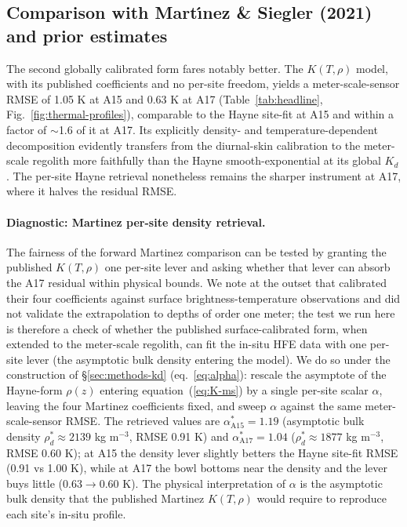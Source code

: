 \documentclass[11pt]{article}
\begin{document}
\subsection{Comparison with Mart{\'\i}nez \& Siegler (2021) and prior estimates}%
\label{sec:disc-prior}
The second globally calibrated
form fares notably better. The \citet{martinez2021} $K(T,\rho)$ model,
with its published coefficients and no per-site freedom, yields a
meter-scale-sensor RMSE of 1.05 K at A15 and 0.63 K at A17
(Table~\ref{tab:headline}, Fig.~\ref{fig:thermal-profiles}),
comparable to the Hayne site-fit at A15 and within a factor of
$\sim$1.6 of it at A17. Its explicitly density- and
temperature-dependent decomposition evidently transfers from the
diurnal-skin calibration to the meter-scale regolith more faithfully
than the Hayne smooth-exponential at its global $K_d$. The per-site
Hayne retrieval nonetheless remains the sharper instrument at A17,
where it halves the residual RMSE.

\paragraph*{Diagnostic: Martinez per-site density retrieval.}
The fairness of the forward Martinez comparison can be tested by granting
the published $K(T,\rho)$ one per-site lever and asking whether that lever
can absorb the A17 residual within physical bounds. We note at the outset
that \citet{martinez2021} calibrated their four coefficients against surface
brightness-temperature observations and did not validate the extrapolation
to depths of order one meter; the test we run here is therefore a check of
whether the published surface-calibrated form, when extended to the
meter-scale regolith, can fit the in-situ HFE data with one
per-site lever (the asymptotic bulk density entering the
model). We do so under the construction of \S\ref{sec:methods-kd}
(eq.~\ref{eq:alpha}): rescale the asymptote of the Hayne-form
$\rho(z)$ entering equation~(\ref{eq:K-ms}) by a single per-site scalar
$\alpha$, leaving the four Martinez coefficients fixed, and sweep $\alpha$
against the same meter-scale-sensor RMSE. The
retrieved values are $\alpha^{*}_{\mathrm{A15}}=1.19$
(asymptotic bulk density
$\rho_d^{*}\approx 2139$
kg m$^{-3}$, RMSE 0.91 K) and
$\alpha^{*}_{\mathrm{A17}}=1.04$
($\rho_d^{*}\approx 1877$ kg m$^{-3}$,
RMSE 0.60 K); at A15 the density
lever slightly betters the Hayne site-fit RMSE (0.91 vs 1.00 K), while
at A17 the bowl bottoms near the \citet{hayne2017} density and the
lever buys little ($0.63\rightarrow0.60$ K). The physical interpretation of
$\alpha$ is the asymptotic bulk density that the published
Martinez $K(T,\rho)$ would require to reproduce each site's in-situ profile.
\end{document}
